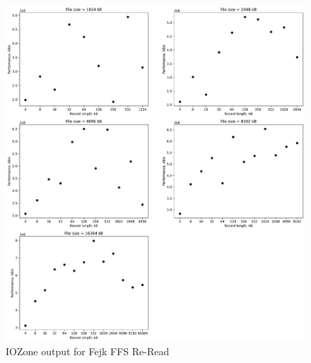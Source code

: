 \begin{figure}[!htb]
	\label{fig:app_bench_fffs_re_read}
	\begin{center}
		\includegraphics[width=1.0\textwidth]{figures/benchmarking/fejk-ffs/Re-Read.pdf}
	\end{center}
	\caption{IOZone output for Fejk FFS \mbox{Re-Read}}
\end{figure}

